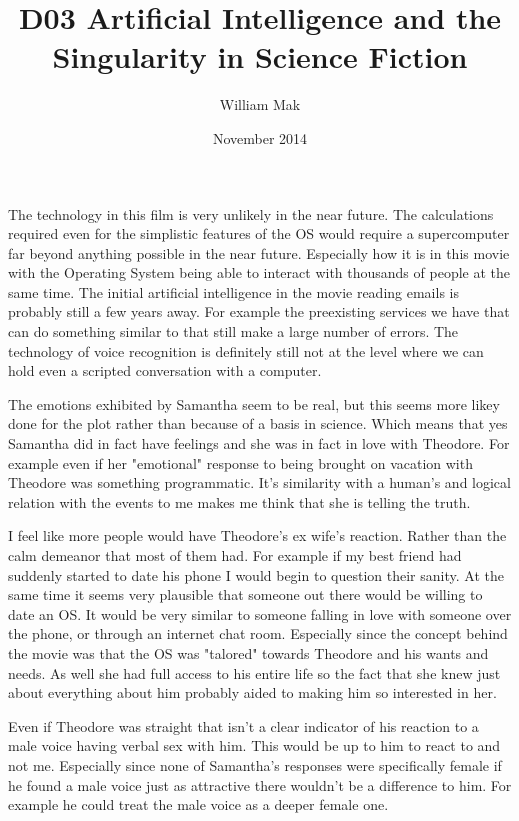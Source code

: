 \documentclass{article}
\title{D03 Artificial Intelligence and the Singularity in Science Fiction}
\author{William Mak}
\date{November 2014}
\begin{document}
\maketitle

The technology in this film is very unlikely in the near future. The
calculations required even for the simplistic features of the OS would require a
supercomputer far beyond anything possible in the near future. Especially how it
is in this movie with the Operating System being able to interact with thousands
of people at the same time. The initial artificial intelligence in the movie
reading emails is probably still a few years away. For example the preexisting
services we have that can do something similar to that still make a large number
of errors. The technology of voice recognition is definitely still not at the
level where we can hold even a scripted conversation with a computer. 

The emotions exhibited by Samantha seem to be real, but this seems more likey
done for the plot rather than because of a basis in science. Which means that
yes Samantha did in fact have feelings and she was in fact in love with
Theodore. For example even if her "emotional" response to being brought on
vacation with Theodore was something programmatic. It's similarity with a
human's and logical relation with the events to me makes me think that she is
telling the truth.

I feel like more people would have Theodore's ex wife's reaction. Rather than
the calm demeanor that most of them had. For example if my best friend had
suddenly started to date his phone I would begin to question their sanity. At
the same time it seems very plausible that someone out there would be willing to
date an OS. It would be very similar to someone falling in love with someone
over the phone, or through an internet chat room. Especially since the concept
behind the movie was that the OS was "talored" towards Theodore and his wants
and needs. As well she had full access to his entire life so the fact that she
knew just about everything about him probably aided to making him so interested
in her.

Even if Theodore was straight that isn't a clear indicator of his reaction to a
male voice having verbal sex with him. This would be up to him to react to and
not me. Especially since none of Samantha's responses were specifically female
if he found a male voice just as attractive there wouldn't be a difference to
him. For example he could treat the male voice as a deeper female one.
\end{document}
